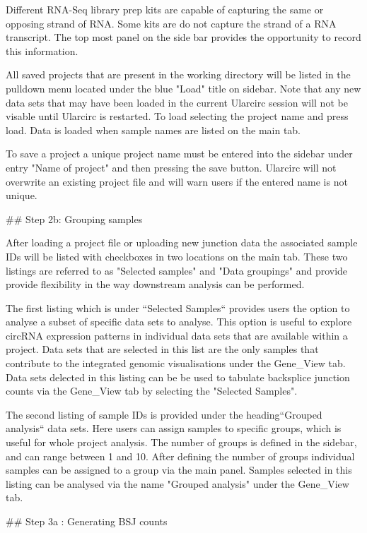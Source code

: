 Different RNA-Seq library prep kits are capable of capturing the same or opposing strand of RNA. Some kits are do not capture the strand of a RNA transcript. The top most panel on the side bar provides the opportunity to record this information.

All saved projects that are present in the working directory will be listed in the pulldown menu located under the blue "Load" title on sidebar. Note that any new data sets that may have been loaded in the current Ularcirc session will not be visable until Ularcirc is restarted. To load selecting the project name and press load. Data is loaded when sample names are listed on the main tab.

To save a project a unique project name must be entered into the sidebar under entry "Name of project" and then pressing the save button. Ularcirc will not overwrite an existing project file and will warn users if the entered name is not unique.

## Step 2b: Grouping samples

After loading a project file or uploading new junction data the associated sample IDs will be listed with checkboxes in two locations on the main tab. These two listings are referred to as "Selected samples" and "Data groupings" and provide provide flexibility in the way downstream analysis can be performed.

The first listing which is under ``Selected Samples`` provides users the option to analyse a subset of specific data sets to analyse. This option is useful to explore circRNA expression patterns in individual data sets that are available within a project. Data sets that are selected in this list are the only samples that contribute to the integrated genomic visualisations under the Gene_View tab. Data sets delected in this listing can be be used to tabulate backsplice junction counts via the Gene_View tab by selecting the "Selected Samples". 

The second listing of sample IDs is provided under the heading``Grouped analysis`` data sets. Here users can assign samples to specific groups, which is useful for whole project analysis. The number of groups is defined in the sidebar, and can range between 1 and 10. After defining the number of groups individual samples can be assigned to a group via the main panel. Samples selected in this listing can be analysed via the name "Grouped analysis" under the Gene_View tab.


## Step 3a : Generating BSJ counts

